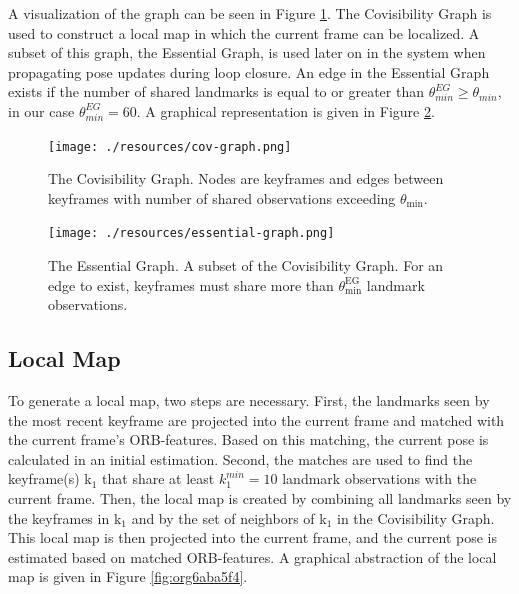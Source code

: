 \documentclass[a4paper, 10pt]{article}
\begin{document}
A visualization of the graph can be seen in Figure \ref{fig:org8ace567}. The Covisibility Graph is used to construct a local map in which the current frame can be localized.
A subset of this graph, the Essential Graph, is used later on in the system when propagating pose updates during loop closure. An edge in the Essential Graph exists if the number of shared landmarks is 
equal to or greater than \(\theta_{min}^{EG} \geq \theta_{min}\), in our case \(\theta_{min}^{EG}=60\). A graphical representation is given in Figure \ref{fig:orgd7c8018}.

\begin{figure}[htbp]
\centering
\texttt{[image: ./resources/cov-graph.png]}
\caption{\label{fig:org8ace567}
The Covisibility Graph. Nodes are keyframes and edges between keyframes with number of shared observations exceeding \(\theta_{\text{min}}\).}
\end{figure}

\begin{figure}[htbp]
\centering
\texttt{[image: ./resources/essential-graph.png]}
\caption{\label{fig:orgd7c8018}
The Essential Graph. A subset of the Covisibility Graph. For an edge to exist, keyframes must share more than \(\theta_{\text{min}}^{\text{EG}}\) landmark observations.}
\end{figure}

\subsection{Local Map}
\label{sec:orgca15894}
To generate a local map, two steps are necessary. First, the landmarks seen by the most recent keyframe are projected into the current frame and matched with the current frame’s ORB-features.
Based on this matching, the current pose is calculated in an initial estimation. Second, the matches are used to find the keyframe(s) k\(_{\text{1}}\) that share at least \(k_1^{min}=10\) landmark observations with the current frame.
Then, the local map is created by combining all landmarks seen by the keyframes in k\(_{\text{1}}\) and by the set of neighbors of k\(_{\text{1}}\) in the Covisibility Graph.
This local map is then projected into the current frame, and the current pose is estimated based on matched ORB-features. A graphical abstraction of the local map is given in Figure \ref{fig:org6aba5f4}.
\end{document}
